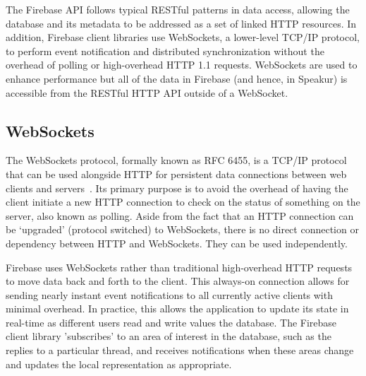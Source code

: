 The Firebase API follows typical RESTful patterns in data access, allowing the database 
and its metadata to be addressed as a set of linked HTTP resources.
In addition, Firebase client libraries use WebSockets, 
a lower-level TCP/IP protocol, 
to perform event notification and distributed synchronization without the overhead of polling or high-overhead HTTP 1.1 requests.
WebSockets are used to enhance performance but all of the data in Firebase 
(and hence, in Speakur) 
is accessible from the RESTful HTTP API outside of a WebSocket.

\subsection{WebSockets}
\label{sec:websockets}
The WebSockets protocol, formally known as RFC 6455, 
is a TCP/IP protocol that can be used alongside HTTP for persistent data connections between web clients and servers~\cite{mozillacontributors2015-a}.
Its primary purpose is to avoid the overhead of having the client initiate a new HTTP connection to check on the status of something on the server, also known as polling.
Aside from the fact that an HTTP connection can be `upgraded' (protocol switched) to WebSockets,
there is no direct connection or dependency between HTTP and WebSockets.
They can be used independently.

Firebase uses WebSockets rather than traditional high-overhead HTTP requests to move data back and forth to the client.
This always-on connection allows for sending nearly instant event notifications to all currently active clients with minimal overhead.
In practice, this allows the application to update its state in real-time as different users read and write values the database.
The Firebase client library 'subscribes' to an area of interest in the database, such as the replies to a particular thread, and receives notifications when these areas change and updates the local representation as appropriate.

